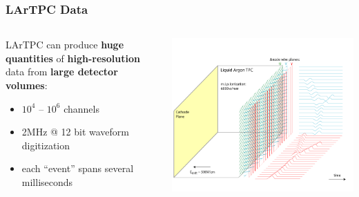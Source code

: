 \begin{frame}
  \frametitle{LArTPC Data}
  
  \vspace{-10mm}

  \begin{columns}
    \begin{column}{0.8\textwidth}
      LArTPC can produce \textbf{huge quantities} of \textbf{high-resolution} data from \textbf{large detector volumes}:
      \begin{itemize}
      \item $10^4$ -- $10^6$ channels
      \item 2MHz @ 12 bit waveform digitization
      \item each ``event'' spans several milliseconds
      \end{itemize}
    \end{column}
    \begin{column}{0.2\textwidth}
      \begin{center}
        \includegraphics[width=\textwidth,trim=13cm 0cm 0cm 0cm,clip]{signal-15.png}

      \end{center}
    \end{column}
  \end{columns}

  \vspace{-5mm}


\end{frame}

